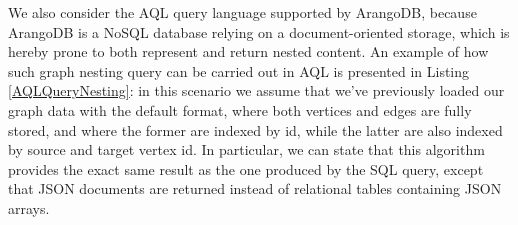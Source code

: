We also consider the AQL query language supported by ArangoDB, because ArangoDB is a NoSQL database relying on a document-oriented storage, which is hereby prone to both represent and return nested content. An example of how such graph nesting query can be carried out in AQL is presented in Listing \ref{AQLQueryNesting}: in this scenario we assume that we've previously loaded our graph data with the default format, where both vertices and edges are fully stored, and where the former are indexed by id, while the latter are also indexed by source and target vertex id. In particular, we can state that this algorithm provides the exact same result as the one produced by the SQL query, except that JSON documents are returned instead of relational tables containing JSON arrays.
%
%
%
%
%
%
%
